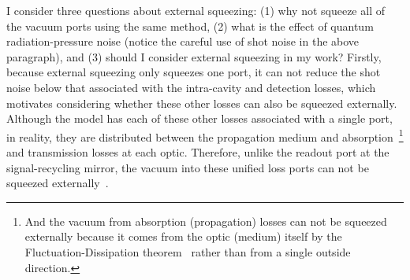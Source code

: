 I consider three questions about external squeezing: (1) why not squeeze all of the vacuum ports using the same method, (2) what is the effect of quantum radiation-pressure noise (notice the careful use of shot noise in the above paragraph), and (3) should I consider external squeezing in my work?
Firstly, because external squeezing only squeezes one port, it can not reduce the shot noise below that associated with the intra-cavity and detection losses, which motivates considering whether these other losses can also be squeezed externally. Although the model has each of these other losses associated with a single port, in reality, they are distributed between the propagation medium and absorption~\footnote{And the vacuum from absorption (propagation) losses can not be squeezed externally because it comes from the optic (medium) itself by the Fluctuation-Dissipation theorem~\cite{} rather than from a single outside direction.} and transmission  losses at each optic. Therefore, unlike the readout port at the signal-recycling mirror, the vacuum into these unified loss ports can not be squeezed externally~\cite{}. 
